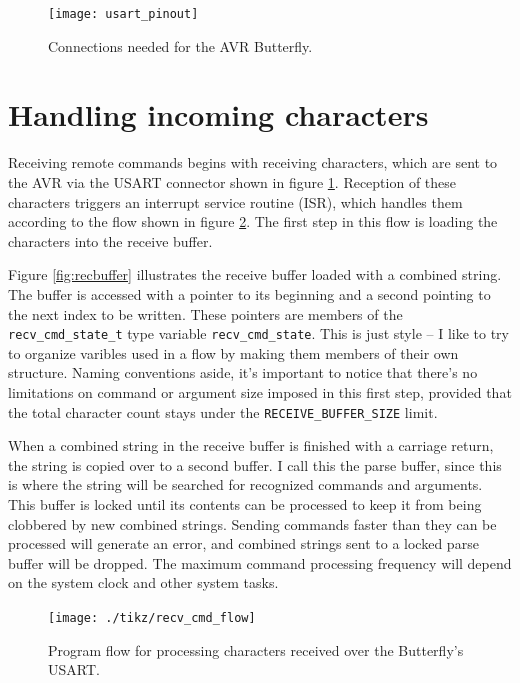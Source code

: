 \begin{figure}[ht]
    \begin{center}
        \texttt{[image: usart\_pinout]}
        \caption{Connections needed for the AVR Butterfly.\label{fig:connections}}
    \end{center}
\end{figure}

\clearpage
\section{Handling incoming characters}
Receiving remote commands begins with receiving characters, which are sent to the AVR via the USART connector shown in figure \ref{fig:connections}.  Reception of these characters triggers an interrupt service routine (ISR), which handles them according to the flow shown in figure \ref{fig:recflow}. The first step in this flow is loading the characters into the receive buffer.

Figure \ref{fig:recbuffer} illustrates the receive buffer loaded with a combined string.  The buffer is accessed with a pointer to its beginning and a second pointing to the next index to be written.  These pointers are members of the \texttt{recv\_cmd\_state\_t} type variable \texttt{recv\_cmd\_state}.  This is just style -- I like to try to organize varibles used in a flow by making them members of their own structure.  Naming conventions aside, it's important to notice that there's no limitations on command or argument size imposed in this first step, provided that the total character count stays under the \texttt{RECEIVE\_BUFFER\_SIZE} limit. 
 
When a combined string in the receive buffer is finished with a carriage return, the string is copied over to a second buffer.  I call this the parse buffer, since this is where the string will be searched for recognized commands and arguments.  This buffer is locked until its contents can be processed to keep it from being clobbered by new combined strings.  Sending commands faster than they can be processed will generate an error, and combined strings sent to a locked parse buffer will be dropped.  The maximum command processing frequency will depend on the system clock and other system tasks.  

\begin{figure}[ht]
    \begin{center}
        \texttt{[image: ./tikz/recv\_cmd\_flow]}
        \caption{Program flow for processing characters received over the Butterfly's USART.\label{fig:recflow}}
    \end{center}
\end{figure}

